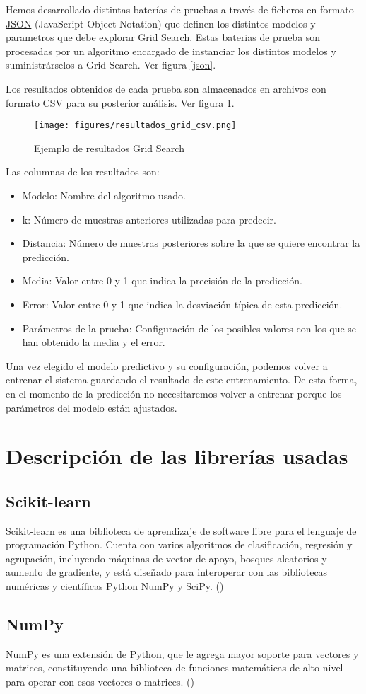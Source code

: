 	Hemos desarrollado distintas baterías de pruebas a través de ficheros en formato \href{www.json.org/json-es.html}{JSON} (JavaScript Object Notation) que definen los distintos modelos y parametros que debe explorar Grid Search.
	Estas baterias de prueba son procesadas por un algoritmo encargado de instanciar los distintos modelos y suministrárselos a Grid Search. Ver figura \ref{json}.

	Los resultados obtenidos de cada prueba son almacenados en archivos con formato CSV para su posterior análisis. Ver figura \ref{csv}.	

	\begin{figure}[htb]
		\begin{center}
			\texttt{[image: figures/resultados\_grid\_csv.png]}
			\caption{Ejemplo de resultados Grid Search \label{csv}}
		\end{center}
	\end{figure}

	Las columnas de los resultados son:
	\begin{itemize}
		\item Modelo: Nombre del algoritmo usado.
		\item k: Número de muestras anteriores utilizadas para predecir.
		\item Distancia: Número de muestras posteriores sobre la que se quiere encontrar la predicción.
		\item Media: Valor entre 0 y 1 que indica la precisión de la predicción.
		\item Error: Valor entre 0 y 1 que indica la desviación típica de esta predicción.
		\item Parámetros de la prueba: Configuración de los posibles valores con los que se han obtenido la media y el error.
	\end{itemize}

	Una vez elegido el modelo predictivo y su configuración, podemos volver a entrenar el sistema guardando el resultado de este entrenamiento. De esta forma, en el momento de la predicción no necesitaremos volver a entrenar porque los parámetros del modelo están ajustados.

\section{Descripción de las librerías usadas}
\label{makereference5.5}
	\subsection{Scikit-learn}
	\label{makereference5.5.1}
	Scikit-learn es una biblioteca de aprendizaje de software libre para el lenguaje de programación Python. Cuenta con varios algoritmos de clasificación, regresión y agrupación, incluyendo máquinas de vector de apoyo, bosques aleatorios y aumento de gradiente, y está diseñado para interoperar con las bibliotecas numéricas y científicas Python NumPy y SciPy. (\cite{ARP:Scikit:2017})
	
	\subsection{NumPy}
	\label{makereference5.5.2}
	NumPy es una extensión de Python, que le agrega mayor soporte para vectores y matrices, constituyendo una biblioteca de funciones matemáticas de alto nivel para operar con esos vectores o matrices. (\cite{ARP:Numpy:2017})